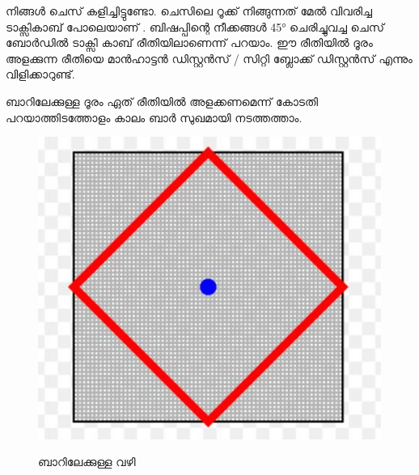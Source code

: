 \documentclass[10pt,a4paper]{report}
\begin{document}
നിങ്ങൾ ചെസ് കളിച്ചിട്ടുണ്ടോ. ചെസിലെ റൂക്ക് നിങ്ങുന്നത്  മേൽ വിവരിച്ച ടാക്സികാബ്  പോലെയാണ് . ബിഷപ്പിന്റെ നീക്കങ്ങൾ 45° ചെരിച്ചുവച്ച ചെസ് ബോർഡിൽ ടാക്സി കാബ് രീതിയിലാണെന്ന് പറയാം. ഈ രീതിയിൽ ദൂരം അളക്കുന്ന രീതിയെ മാൻഹാട്ടൻ ഡിസ്റ്റൻസ് / സിറ്റി ബ്ലോക്ക് ഡിസ്റ്റൻസ് എന്നും വിളിക്കാറുണ്ട്.
          
          ബാറിലേക്കുള്ള ദൂരം ഏത് രീതിയിൽ അളക്കണമെന്ന് കോടതി പറയാത്തിടത്തോളം കാലം ബാർ സുഖമായി നടത്തത്താം.
 \begin{figure}[H]
  \center
\includegraphics[scale=.25]{images/bar5}
\label{bar5}
\caption{   ബാറിലേക്കുള്ള വഴി }
\end{figure}


%
\end{document}

